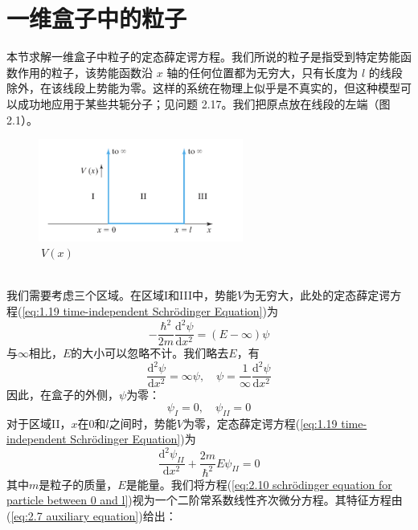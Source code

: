 \section{一维盒子中的粒子}
\label{sec:2.2 Particle in a One-Dimensional Box}
	本节求解一维盒子中粒子的定态薛定谔方程。我们所说的粒子是指受到特定势能函数作用的粒子，该势能函数沿 $x$ 轴的任何位置都为无穷大，只有长度为 $l$ 的线段除外，在该线段上势能为零。这样的系统在物理上似乎是不真实的，但这种模型可以成功地应用于某些共轭分子；见问题 2.17。我们把原点放在线段的左端（图 2.1）。
	\begin{figure}[h!]
		\centering
		\includegraphics[width=0.6\textwidth]{Figures/2.1.png}  %
		\caption{$\: V\left(x\right)$}
		\label{fig:2.1}
	\end{figure}
	\\
	\indent 我们需要考虑三个区域。在区域I和III中，势能$V$为无穷大，此处的定态薛定谔方程(\ref{eq:1.19 time-independent Schrödinger Equation})为
	\begin{equation*}
		-\frac{\hbar^2}{2m}\frac{\mathrm{d}^2\psi}{\mathrm{d}x^2} = \left(E - \infty\right)\psi
	\end{equation*}
	与$\infty$相比，$E$的大小可以忽略不计。我们略去$E$，有
	\begin{equation*}
		\frac{\mathrm{d}^2\psi}{\mathrm{d}x^2} = \infty \psi, \quad \psi = \frac{1}{\infty}\frac{\mathrm{d}^2\psi}{\mathrm{d}x^2}
	\end{equation*}
	因此，在盒子的外侧，$\psi$为零：
	\begin{equation}
		\psi_I=0, \quad \psi_{II} = 0
		\label{eq:2.9 psi outside the box}
	\end{equation}
	\indent 对于区域II，$x$在0和$l$之间时，势能$V$为零，定态薛定谔方程(\ref{eq:1.19 time-independent Schrödinger Equation})为
	\begin{equation}
		\frac{\mathrm{d}^2\psi_{II}}{\mathrm{d}x^2}+\frac{2m}{\hbar^2}E\psi_{II}=0
		\label{eq:2.10 schrödinger equation for particle between 0 and l}
	\end{equation}
	其中$m$是粒子的质量，$E$是能量。我们将方程(\ref{eq:2.10 schrödinger equation for particle between 0 and l})视为一个二阶常系数线性齐次微分方程。其特征方程由(\ref{eq:2.7 auxiliary equation})给出：
